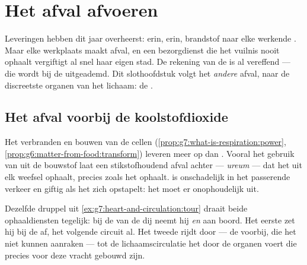 \chapter{Het afval afvoeren}\label{ch:g7:removing-wastes}

Leveringen hebben dit jaar overheerst:  erin, 
erin, brandstof naar elke werkende . Maar elke werkplaats maakt afval,
en een bezorgdienst die het vuilnis nooit ophaalt vergiftigt al snel haar
eigen stad. De rekening van de  is al vereffend --- die
wordt bij de  uitgeademd. Dit slothoofdstuk volgt het
\emph{andere} afval, naar de discreetste organen van het lichaam: de
.

\section{Het afval voorbij de koolstofdioxide}

\begin{proposition}\label{prop:g7:removing-wastes:rubbish}
Het verbranden en bouwen van de cellen
(\cref{prop:g7:what-is-respiration:power},
\cref{prop:g6:matter-from-food:transform}) leveren meer op dan
. Vooral het gebruik van  uit de bouwstof
laat een stikstofhoudend afval achter --- \emph{ureum} ---
dat het  uit elk weefsel ophaalt, precies zoals het 
ophaalt.  is onschadelijk in het passerende verkeer en giftig als het
zich opstapelt: het moet er onophoudelijk uit.
\end{proposition}
\admitted

\begin{example}\label{ex:g7:removing-wastes:rounds}
Dezelfde druppel uit \cref{ex:g7:heart-and-circulation:tour} draait beide
ophaaldiensten tegelijk: bij de  van de dij neemt hij
 \emph{en}  aan boord. Het eerste zet hij bij de
 af, het volgende circuit al. Het tweede rijdt door --- de 
voorbij, die het niet kunnen aanraken --- tot de lichaamscirculatie het
door de organen voert die precies voor deze vracht gebouwd zijn.
\end{example}

